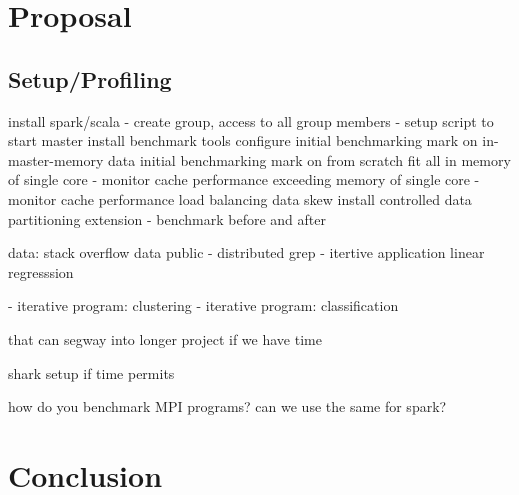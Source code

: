 \documentclass{article}
\begin{document}

\section*{Proposal}

\subsection*{Setup/Profiling}

install spark/scala
- create group, access to all group members
- setup script to start master
install benchmark tools configure
initial benchmarking mark on in-master-memory data
initial benchmarking mark on from scratch
fit all in memory of single core
- monitor cache performance
exceeding memory of single core
- monitor cache performance
load balancing data skew
install controlled data partitioning extension
- benchmark before and after

data:
stack overflow data public
- distributed grep
- itertive application linear regresssion

- iterative program: clustering
- iterative program: classification

that can segway into longer project if we have time

shark setup if time permits


how do you benchmark MPI programs?
can we use the same for spark?








\section*{Conclusion}




\end{document}
